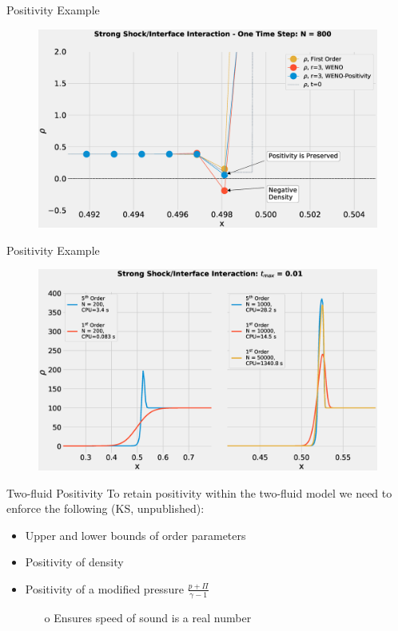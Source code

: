 \documentclass[10pt]{beamer}
\begin{document}
\begin{frame}{Positivity Example}
  \begin{figure}[H]
    \centering
    \includegraphics[scale=0.275]{PositivityZoomDenstiy.eps}
    \end{figure}
\end{frame}

\begin{frame}{Positivity Example}
  \begin{figure}[H]
    \centering
    \includegraphics[scale=0.275]{ShockInterfaceComparison.eps}
    \end{figure}
\end{frame}

\begin{frame}{Two-fluid Positivity}
  To retain positivity within the two-fluid model we need to enforce the following (KS, unpublished):
  \begin{itemize}
    \item Upper and lower bounds of order parameters
    \item Positivity of density
    \item Positivity of a modified pressure $\frac{p+\Pi}{\gamma-1}$  
    \begin{itemize}
      \item[o] Ensures speed of sound is a real number
    \end{itemize}
  \end{itemize}
\end{frame}
\end{document}
